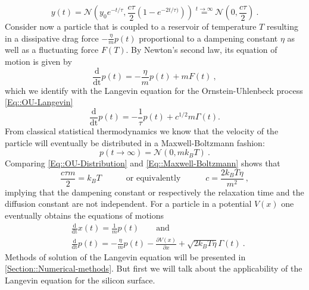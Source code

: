  		\begin{equation} \label{Eq::OU-Distribution}
 			y(t) =	\mathcal{N}\left(y_0 e^{-t/\tau}, \frac{c\tau}{2} \left(1 - e^{-2t /	\tau)}\right)\right) \overset{t \rightarrow \infty}{=} \mathcal{N}\left(0 , \frac{c\tau}{2}\right) ~.
 		\end{equation}
 		Consider now a particle that is coupled to a reservoir of temperature $T$ resulting in a dissipative drag force $- \frac{\eta}{m} p(t)$ proportional to a dampening constant $\eta$ as well as a fluctuating force $F(T)$. By Newton's second law, its equation of motion is given by
 		\begin{equation}
 			\frac{\text{d}}{\text{dt}} p(t) =	- \frac{\eta}{m} p(t) + m F(t)~,
 		\end{equation}
 		which we identify with the Langevin equation for the Ornstein-Uhlenbeck process \autoref{Eq::OU-Langevin}
 		\begin{equation}
 			\frac{\text{d}}{\text{dt}} p(t) =	- \frac{1}{\tau} p(t) + { c^{1/2}}{m} \Gamma(t).
 		\end{equation}
 		From classical statistical thermodynamics we know that the velocity of the particle will eventually be distributed in a Maxwell-Boltzmann fashion:
 		\begin{equation} \label{Eq::Maxwell-Boltzmann}
 			p(t\rightarrow \infty) =	\mathcal{N}(0, m k_B T)~.
 		\end{equation}
 		Comparing \autoref{Eq::OU-Distribution} and \autoref{Eq::Maxwell-Boltzmann} shows that
 		\begin{equation}
 			\frac{c \tau m}{2} =	k_B T \qquad \quad \text{or equivalently} \qquad \quad c =	\frac{2 k_B T \eta }{m^2}~, 			
 		\end{equation}
 		implying that the dampening constant or respectively the relaxation time and the diffusion constant are not independent. For a particle in a potential $V(x)$ one eventually obtains the equations of motions
 		\begin{align} \label{Eq::Langevin-eq-motion-set-x}
 			&\frac{\text{d}}{\text{dt}} x(t) =	\frac{1}{m} p(t) \qquad \text{and}\\
 			\label{Eq::Langevin-eq-motion-set-p}
 			&\frac{\text{d}}{\text{dt}} p(t) =	- \frac{\eta}{m} p(t) - \frac{\partial V(x)}{\partial x} + \sqrt{2 k_B T \eta } \Gamma(t) ~.
 		\end{align} 	
 		Methods of solution of the Langevin equation will be presented in \autoref{Section::Numerical-methods}. But first we will talk about the applicability of the Langevin equation for the silicon surface.
